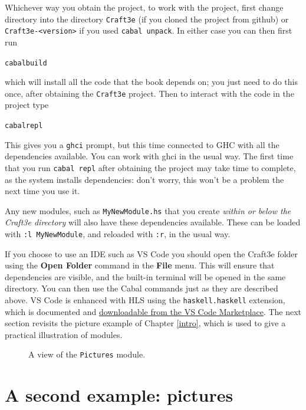 Whichever way you obtain the project, to work with the project, first change directory into the directory \texttt{Craft3e} (if you cloned the project from github) or \texttt{Craft3e-<version>} if you used \texttt{cabal unpack}. In either case you can then first run
\begin{alltt}
cabal build  
\end{alltt} 
which will install all the code that the book depends on; you just need to do this once, after obtaining the \texttt{Craft3e} project. Then to interact with the code in the project type
\begin{alltt}
cabal repl
\end{alltt}
This gives you a \texttt{ghci} prompt, but this time connected to GHC with all the dependencies available. You can work with ghci in the usual way.  The first time that you run \texttt{cabal repl} after obtaining the project may take time to complete, as the system installs dependencies: don't worry, this won't be a problem the next time you use it. 

Any new modules, such as \texttt{MyNewModule.hs} that you create \emph{within or below the Craft3e directory} will also have these dependencies available. These can be loaded with \texttt{:l MyNewModule}, and reloaded with \texttt{:r}, in the usual way.

If you choose to use an IDE such as VS Code you should open the Craft3e folder using the \textbf{Open Folder} command in the \textbf{File} menu. This will ensure that dependencies are visible, and the built-in terminal will be opened in the same directory. You can then use the Cabal commands just as they are described above.  VS Code is enhanced with HLS using the \texttt{haskell.haskell} extension, which is documented and \href{https://marketplace.visualstudio.com/items?itemName=haskell.haskell}{downloadable from the VS Code Marketplace}.
The next section revisits the picture example of Chapter
\ref{intro}, which is used to give a practical illustration of modules.


\begin{figure}[p]
\begin{alltt}

\end{alltt}
\caption{A view of the \texttt{Pictures} module.}
\label{pictScript}
\vspace*{-12pt}
\end{figure}

\section{A second example: pictures}\label{picModuleEx}

